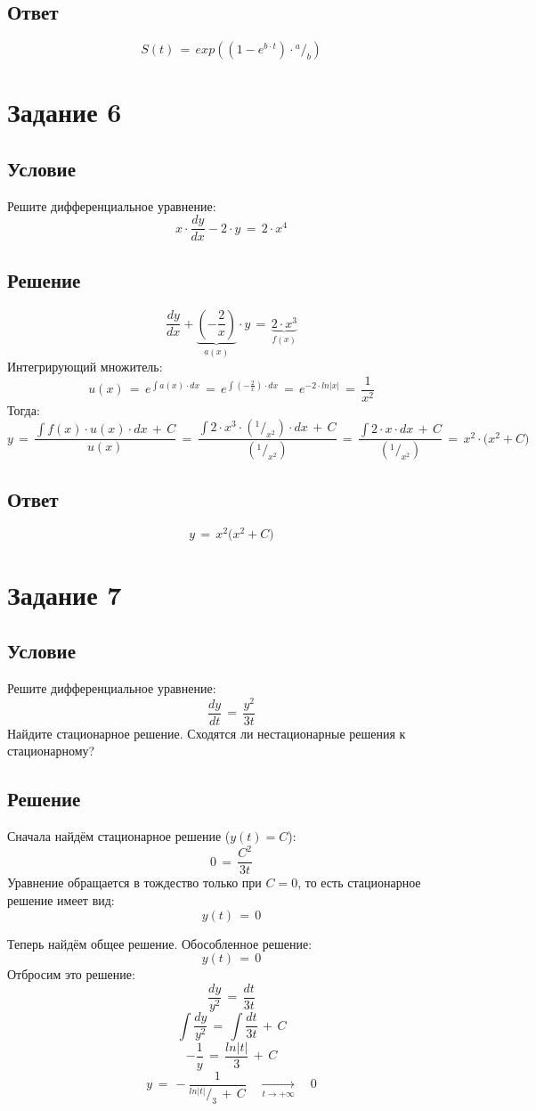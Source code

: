 \documentclass{article}
\newcommand*\rfrac[2]{{}^{#1}\!/_{#2}}
\begin{document}
\subsection*{Ответ}
\[ S(t) \, = \, exp \left( (1 \! - \! e^{b \cdot t}) \! \cdot \rfrac{a}{b} \right) \]
\section*{Задание 6}
\subsection*{Условие}
Решите дифференциальное уравнение:
\[ x \! \cdot \! \dfrac{dy}{dx} \! - \! 2 \! \cdot \! y \, = \, 2 \! \cdot \! x^4 \]
\subsection*{Решение}
\[ \dfrac{dy}{dx} \! + \! \underbrace{\left( - \dfrac{2}{x} \right)}_{a(x)} \! \cdot y \, = \, \underbrace{2 \! \cdot \! x^3}_{f(x)} \]
Интегрирующий множитель:
\[ u(x) \, = \, e^{\int a(x) \cdot dx} \, = \, e^{\int \left( -\frac{2}{x} \right) \cdot dx} \, = \, e^{-2 \cdot ln|x|} \, = \, \dfrac{1}{x^2} \]
Тогда:
\[ y \, = \, \dfrac{\int f(x) \! \cdot \! u(x) \! \cdot \! dx \, + \, C}{u(x)} \, = \, \dfrac{\int 2 \! \cdot \! x^3 \! \cdot \! (\rfrac{1}{x^2}) \! \cdot \! dx \, + \, C}{(\rfrac{1}{x^2})} \, = \, \dfrac{\int 2 \! \cdot \! x \! \cdot \! dx \, + \, C}{(\rfrac{1}{x^2})} \, = \, x^2 \! \cdot \! \big( x^2 \! + \! C \big) \]
\subsection*{Ответ}
\[ y \, = \, x^2 \big( x^2 \! + \! C \big) \]
\section*{Задание 7}
\subsection*{Условие}
Решите дифференциальное уравнение: 
\[ \dfrac{dy}{dt} \, = \, \dfrac{y^2}{3t} \]
Найдите стационарное решение. Сходятся ли нестационарные решения к стационарному?
\subsection*{Решение}
Сначала найдём стационарное решение ($ y(t) \! = \! C $):
\[ 0 \, = \, \dfrac{C^2}{3t} \]
Уравнение обращается в тождество только при $ C \! = \! 0 $, то есть стационарное решение имеет вид:
\[ y(t) \, = \, 0 \]\par
Теперь найдём общее решение. Обособленное решение:
\[ y(t) \, = \, 0 \]
Отбросим это решение:
\[ \dfrac{dy}{y^2} \, = \, \dfrac{dt}{3t} \]
\[ \int \dfrac{dy}{y^2} \, = \, \int \dfrac{dt}{3t} \, + \, C \]
\[ -\dfrac{1}{y} \, = \, \dfrac{ln|t|}{3} \, + \, C \]
\[ y \, = \, -\dfrac{1}{\rfrac{ln|t|}{3} \, + \, C} \quad \underset{t \rightarrow +\infty}{\longrightarrow} \quad 0 \]\par
\end{document}
